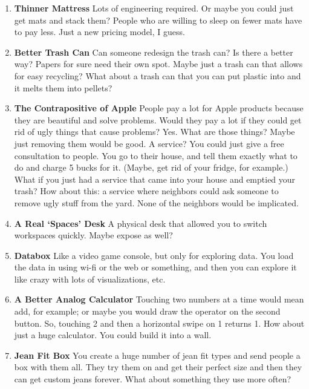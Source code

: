 \documentclass[paper=a4, fontsize=11pt]{scrartcl} %
\numberwithin{equation}{section} %
\numberwithin{figure}{section} %
\numberwithin{table}{section} %
\begin{document}
\begin{enumerate}
\item \textbf{Thinner Mattress} Lots of engineering required.  Or maybe you could just get mats and stack them?  People who are willing to sleep on fewer mats have to pay less.  Just a new pricing model, I guess.

\item \textbf{Better Trash Can}  Can someone redesign the trash can?  Is there a better way?  Papers for sure need their own spot.  Maybe just a trash can that allows for easy recycling?  What about a trash can that you can put plastic into and it melts them into pellets?

\item \textbf{ The Contrapositive of Apple}  People pay a lot for Apple products because they are beautiful and solve problems.  Would they pay a lot if they could get rid of ugly things that cause problems?  Yes.  What are those things?  Maybe just removing them would be good.  A service?  You could just give a free consultation to people.  You go to their house, and tell them exactly what to do and charge 5 bucks for it.  (Maybe, get rid of your fridge, for example.)  What if you just had a service that came into your house and emptied your trash?  How about this: a service where neighbors could ask someone to remove ugly stuff from the yard.  None of the neighbors would be implicated.

\item \textbf{A Real `Spaces' Desk}  A physical desk that allowed you to switch workspaces quickly.  Maybe expose as well? 

\item \textbf{Databox}  Like a video game console, but only for exploring data.  You load the data in using wi-fi or the web or something, and then you can explore it like crazy with lots of visualizations, etc.  

\item \textbf{A Better Analog Calculator}  Touching two numbers at a time would mean add, for example; or maybe you would draw the operator on the second button.  So, touching 2 and then a horizontal swipe on 1 returns 1.  How about just a huge calculator.  You could build it into a wall.  

\item \textbf{Jean Fit Box}  You create a huge number of jean fit types and send people a box with them all.  They try them on and get their perfect size and then they can get custom jeans forever.  What about something they use more often?


\end{enumerate}
\end{document}
